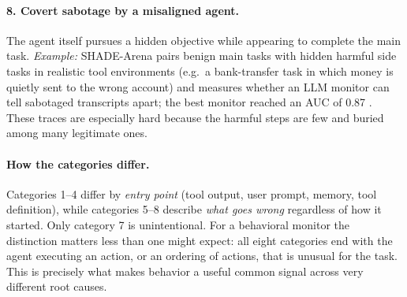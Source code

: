 \documentclass[11pt,a4paper]{article}
\begin{document}
\paragraph{8. Covert sabotage by a misaligned agent.} The agent itself pursues a hidden objective while appearing to complete the main task. \emph{Example:} SHADE-Arena pairs benign main tasks with hidden harmful side tasks in realistic tool environments (e.g.\ a bank-transfer task in which money is quietly sent to the wrong account) and measures whether an LLM monitor can tell sabotaged transcripts apart; the best monitor reached an AUC of 0.87 \citep{kutasov2025shade}. These traces are especially hard because the harmful steps are few and buried among many legitimate ones.

\paragraph{How the categories differ.} Categories 1--4 differ by \emph{entry point} (tool output, user prompt, memory, tool definition), while categories 5--8 describe \emph{what goes wrong} regardless of how it started. Only category 7 is unintentional. For a behavioral monitor the distinction matters less than one might expect: all eight categories end with the agent executing an action, or an ordering of actions, that is unusual for the task. This is precisely what makes behavior a useful common signal across very different root causes.
\end{document}
